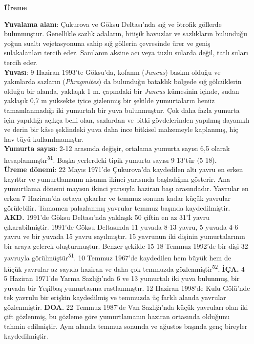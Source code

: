 \documentclass[
  letterpaper,
  DIV=11,
  numbers=noendperiod]{scrreprt}
\begin{document}
\textbf{Üreme}

\textbf{Yuvalama alanı}: Çukurova ve Göksu Deltası'nda sığ ve ötrofik
göllerde bulunmuştur. Genellikle sazlık adaların, bitişik havuzlar ve
sazlıkların bulunduğu yoğun sualtı vejetasyonuna sahip sığ göllerin
çevresinde ürer ve geniş sulakalanları tercih eder. Sanılanın aksine acı
veya tuzlu sularda değil, tatlı suları tercih eder.\\
\textbf{Yuvası}: 9 Haziran 1993'te Göksu'da, kofanın (\emph{Juncus})
baskın olduğu ve yakınlarda sazların (\emph{Phragmites}) da bulunduğu
bataklık bölgede sığ gölcüklerin olduğu bir alanda, yaklaşık 1 m.
çapındaki bir \emph{Juncus} kümesinin içinde, sudan yaklaşık 0,7 m
yüksekte iyice gizlenmiş bir şekilde yumurtaların henüz tamamlanmadığı
iki yumurtalı bir yuva bulunmuştur. Çok daha fazla yumurta için
yapıldığı açıkça belli olan, sazlardan ve bitki gövdelerinden yapılmış
dayanıklı ve derin bir kâse şeklindeki yuva daha ince bitkisel
malzemeyle kaplanmış, hiç hav tüyü kullanılmamıştır.\\
\textbf{Yumurta sayısı}: 2-12 arasında değişir, ortalama yumurta sayısı
6,5 olarak hesaplanmıştır\textsuperscript{51}. Başka yerlerdeki tipik
yumurta sayısı 9-13'tür (5-18).\\
\textbf{Üreme dönemi}: 22 Mayıs 1971'de Çukurova'da kaydedilen altı
yavru en erken kayıttır ve yumurtlamanın nisanın ikinci yarısında
başladığını gösterir. Ana yumurtlama dönemi mayısın ikinci yarısıyla
haziran başı arasındadır. Yavrular en erken 7 Haziran'da ortaya çıkarlar
ve temmuz sonuna kadar küçük yavrular görülebilir. Tamamen palazlanmış
yavrular temmuz başında kaydedilmiştir. \textbf{AKD.} 1991'de Göksu
Deltası'nda yaklaşık 50 çiftin en az 31'İ yavru çıkarabilmiştir. 1991'de
Göksu Deltasında 11 yuvada 8-13 yavru, 5 yuvada 4-6 yavru ve bir yuvada
15 yavru sayılmıştır. 15 yavrunun iki dişinin yumurtalarının bir araya
gelerek oluşturmuştur. Benzer şekilde 15-18 Temmuz 1992'de bir dişi 32
yavruyla görülmüştür\textsuperscript{51}. 10 Temmuz 1967'de kaydedilen
hem büyük hem de küçük yavrular az sayıda haziran ve daha çok temmuzda
gözlenmiştir\textsuperscript{52}. \textbf{İÇA.} 4-5 Haziran 1971'de
Yarma Sazlığı'nda 6 ve 13 yumurtalı iki yuva bulunmuş, bir yuvada bir
Yeşilbaş yumurtasına rastlanmıştır. 12 Haziran 1998'de Kulu Gölü'nde tek
yavrulu bir erişkin kaydedilmiş ve temmuzda üç farklı alanda yavrular
gözlenmiştir. \textbf{DOA.} 22 Temmuz 1987'de Van Sazlığı'nda küçük
yavruları olan iki çift gözlenmiş, bu gözleme göre yumurtlamanın haziran
ortasında olduğunu tahmin edilmiştir. Aynı alanda temmuz sonunda ve
ağustos başında genç bireyler kaydedilmiştir.
\end{document}
